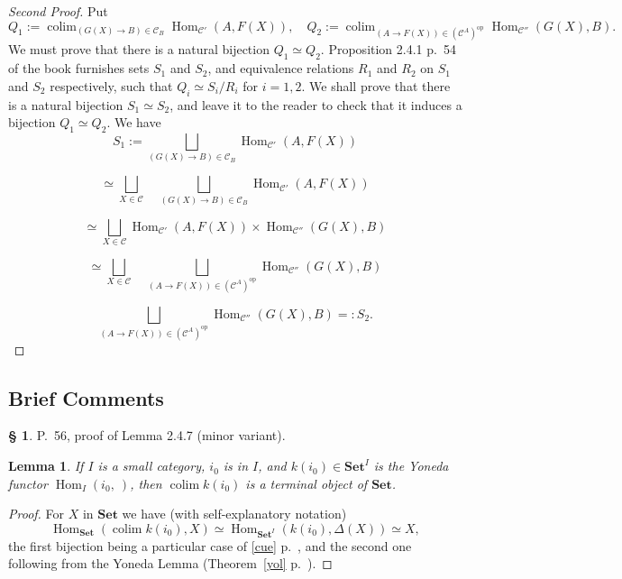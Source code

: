 \documentclass[12pt]{article}%
\newtheorem{lem}[thm]{Lemma}
\theoremstyle{remark}
\theoremstyle{definition}
\newtheorem{s}[thm]{\S}%
\newcommand{\C}{\mathcal C}
\newcommand{\Set}{\mathbf{Set}}%
\DeclareMathOperator*{\colim}{colim}%
\DeclareMathOperator{\Hom}{Hom}%
\DeclareMathOperator{\op}{op}
\begin{document}
\begin{proof}[Second Proof]
Put 
$$
Q_1:=\colim_{(G(X)\to B)\in\C_B}\Hom_{\C'}(A,F(X)),\quad Q_2:=\colim_{(A\to F(X))\in(\C^A)^{\op}}\Hom_{\C''}(G(X),B).
$$ 
We must prove that there is a natural bijection $Q_1\simeq Q_2$. Proposition 2.4.1 p.~54 of the book furnishes sets $S_1$ and $S_2$, and equivalence relations $R_1$ and $R_2$ on $S_1$ and $S_2$ respectively, such that $Q_i\simeq S_i/R_i$ for $i=1,2$. We shall prove that there is a natural bijection $S_1\simeq S_2$, and leave it to the reader to check that it induces a bijection $Q_1\simeq Q_2$. We have 
$$
S_1:=\bigsqcup_{(G(X)\to B)\in\C_B}\Hom_{\C'}(A,F(X))
$$

$$
\simeq\bigsqcup_{X\in\C}\quad\bigsqcup_{(G(X)\to B)\in\C_B}\Hom_{\C'}(A,F(X))
$$

$$
\simeq\bigsqcup_{X\in\C}\Hom_{\C'}(A,F(X))\times\Hom_{\C''}(G(X),B)
$$

$$
\simeq\bigsqcup_{X\in\C}\quad\bigsqcup_{(A\to F(X))\in(\C^A)^{\op}}\Hom_{\C''}(G(X),B)
$$

$$
\bigsqcup_{(A\to F(X))\in(\C^A)^{\op}}\Hom_{\C''}(G(X),B)=:S_2.
$$
\end{proof}


\subsection{Brief Comments}

\begin{s} 
P.~56, proof of Lemma 2.4.7 (minor variant).

\begin{lem} 
If $I$ is a small category, $i_0$ is in $I$, and $k(i_0)\in\Set^I$ is the Yoneda functor $\Hom_I(i_0,\ )$, then $\colim k(i_0)$ is a terminal object of $\Set$. 
\end{lem}

\begin{proof}
For $X$ in $\Set$ we have (with self-explanatory notation)
$$
\Hom_{\Set}\left(\colim k(i_0),X\right)\simeq\Hom_{{\Set}^I}(k(i_0),\Delta(X))\simeq X,
$$
the first bijection being a particular case of \eqref{cue} p.~\pageref{cue}, and the second one following from the Yoneda Lemma (Theorem~\ref{yol} p.~\pageref{yol}).
\end{proof}
\end{s}

%
\end{document}
